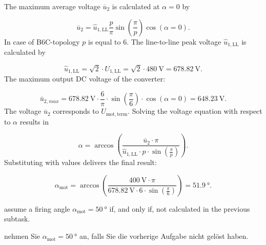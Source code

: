 \begin{solutionblock}
    The maximum average voltage $\overline{u}_\mathrm{2}$ is calculated at $\alpha=0$ by
     
    $$\overline{u}_\mathrm{2} = \hat{u}_\mathrm{1,LL} \frac{p}{\pi}\sin(\frac{\pi}{p}) \cos(\alpha=0).$$
    In case of B6C-topology $p$ is equal to 6. The line-to-line peak voltage $\hat{u}_\mathrm{1,LL}$ is calculated by
    
    $$ \hat{u}_\mathrm{1,LL}=\sqrt{2} \cdot U_\mathrm{1,LL} = \sqrt{2} \cdot \SI{480}{\volt}=\SI{678.82}{\volt}.$$
    The maximum output DC voltage of the converter:
    
    $$    \bar{u}_{2,max} = \SI{678.82}{\volt} \cdot \frac{6}{\pi} \cdot \sin(\frac{\pi}{6}) \cdot \cos(\alpha=0) = \SI{648.23}{\volt}.$$
    The voltage $\overline{u}_\mathrm{2}$ corresponds to $U_\mathrm{mot,term}$. Solving the voltage equation with respect to $\alpha$ results in
    
    $$   \alpha = \arccos( \frac{\overline{u}_\mathrm{2} \cdot \pi}{\hat{u}_\mathrm{1,LL}\cdot p \cdot  \sin(\frac{\pi}{p})}).$$
    Substituting with values delivers the final result:
    
    $$ \alpha_\mathrm{mot} = \arccos( \frac{\SI{400}{\volt} \cdot \pi}{\SI{678.82}{\volt}\cdot 6 \cdot \sin(\frac{\pi}{6})})=\SI{51.9}{\degree}.$$
    
\end{solutionblock}
\begin{hintblock}
    assume a firing angle $\alpha_\mathrm{mot} = \SI{50}{\degree}$ if, and only if, not calculated in the previous subtask.
\end{hintblock}
\begin{germanhintblock}
    nehmen Sie $\alpha_\mathrm{mot} = \SI{50}{\degree}$ an, falls Sie die vorherige Aufgabe nicht gelöst haben.
\end{germanhintblock}

\begin{solutionblock}
       

\end{solutionblock}
